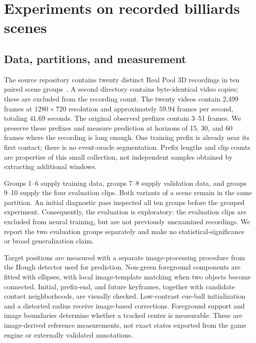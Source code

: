 \section{Experiments on recorded billiards scenes}
\label{sec:experiments}

\subsection{Data, partitions, and measurement}

The source repository contains twenty distinct Real Pool 3D recordings in ten paired scene groups~\citep{projectrepo}. A second directory contains byte-identical video copies; these are excluded from the recording count. The twenty videos contain 2,499 frames at $1280\times720$ resolution and approximately $59.94$ frames per second, totaling $41.69$ seconds. The original observed prefixes contain 3--51 frames. We preserve these prefixes and measure prediction at horizons of 15, 30, and 60 frames where the recording is long enough. One training prefix is already near its first contact; there is no event-oracle segmentation. Prefix lengths and clip counts are properties of this small collection, not independent samples obtained by extracting additional windows.

Groups 1--6 supply training data, groups 7--8 supply validation data, and groups 9--10 supply the four evaluation clips. Both variants of a scene remain in the same partition. An initial diagnostic pass inspected all ten groups before the grouped experiment. Consequently, the evaluation is exploratory: the evaluation clips are excluded from neural training, but are not previously unexamined recordings. We report the two evaluation groups separately and make no statistical-significance or broad generalization claim.

Target positions are measured with a separate image-processing procedure from the Hough detector used for prediction. Non-green foreground components are fitted with ellipses, with local image-template matching when two objects become connected. Initial, prefix-end, and future keyframes, together with candidate contact neighborhoods, are visually checked. Low-contrast cue-ball initialization and a distorted radius receive image-based corrections. Foreground support and image boundaries determine whether a tracked center is measurable. These are image-derived reference measurements, not exact states exported from the game engine or externally validated annotations.

